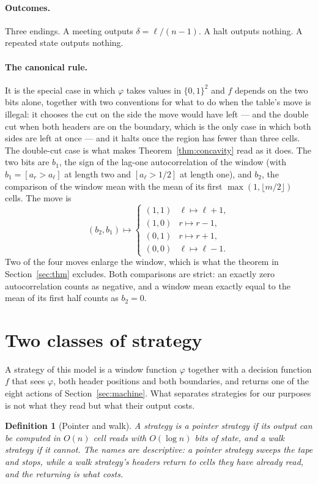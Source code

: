 \documentclass[11pt]{article}
\newtheorem{definition}{Definition}
\begin{document}
\paragraph{Outcomes.} Three endings. A meeting outputs $\delta=\ell/(n-1)$. A halt outputs nothing. A
repeated state outputs nothing.

\paragraph{The canonical rule.} It is the special case in which $\varphi$ takes values in
$\{0,1\}^{2}$ and $f$ depends on the two bits alone, together with two conventions for what to do when the
table's move is illegal: it chooses the cut on the side the move would have left --- and the double
cut when both headers are on the boundary, which is the only case in which both sides are left at
once --- and it halts once the region has fewer than three cells. The double-cut case is what makes
Theorem~\ref{thm:concavity} read as it does. The two bits are $b_1$, the sign of the lag-one
autocorrelation of the window (with $b_1=[a_r>a_\ell]$ at length two and $[a_\ell>1/2]$ at length one),
and $b_2$, the comparison of the window mean with the mean of its first
$\max(1,\lfloor m/2\rfloor)$ cells. The move is
\[
(b_2,b_1)\mapsto
\begin{cases}
(1,1)&\ell\mapsto\ell+1,\\
(1,0)&r\mapsto r-1,\\
(0,1)&r\mapsto r+1,\\
(0,0)&\ell\mapsto\ell-1.
\end{cases}
\]
Two of the four moves enlarge the window, which is what the theorem in Section~\ref{sec:thm}
excludes. Both comparisons are strict: an exactly zero autocorrelation counts as negative, and a
window mean exactly equal to the mean of its first half counts as $b_2=0$.

\section{Two classes of strategy}\label{sec:classes}

A strategy of this model is a window function $\varphi$ together with a decision function $f$ that
sees $\varphi$, both header positions and both boundaries, and returns one of the eight
actions of Section~\ref{sec:machine}. What separates strategies for our purposes is not
what they read but what their output costs.

\begin{definition}[Pointer and walk]
A strategy is a \emph{pointer} strategy if its output can be computed in $O(n)$ cell reads with
$O(\log n)$ bits of state, and a \emph{walk} strategy if it cannot. The names are descriptive: a pointer
strategy sweeps the tape and stops, while a walk strategy's headers return to cells they have already
read, and the returning is what costs.
\end{definition}
\end{document}
